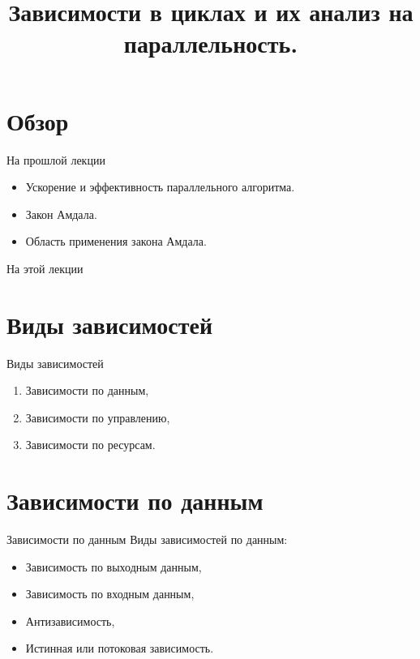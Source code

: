 

\title{Зависимости в циклах и их анализ на параллельность.}



\begin{frame}
\titlepage
\end{frame}

\section*{Обзор}

\begin{frame}{На прошлой лекции}
\begin{itemize}
\ifsbertech
    \item Ускорение и эффективность параллельного алгоритма.
    \item Закон Амдала.
    \item Область применения закона Амдала.
\fi
\end{itemize}
\end{frame}

\begin{frame}{На этой лекции}
\tableofcontents
\end{frame}

\section{Виды зависимостей}

\begin{frame}{Виды зависимостей}
\begin{enumerate}
    \item Зависимости по данным,
    \pause
    \item Зависимости по управлению,
    \pause
    \item Зависимости по ресурсам.
\end{enumerate}
\end{frame}

\section{Зависимости по данным}

\begin{frame}{Зависимости по данным}
Виды зависимостей по данным:

\begin{itemize}
    \item Зависимость по выходным данным,
    \item Зависимость по входным данным,
    \item Антизависимость,
    \item Истинная или потоковая зависимость.
\end{itemize}
\end{frame}

